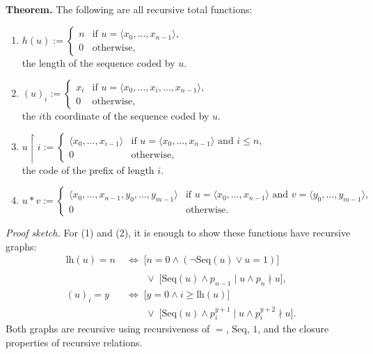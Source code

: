 \documentclass[11pt]{article}
\begin{document}
\textbf{Theorem.} The following are all recursive total functions:
\begin{enumerate}[leftmargin=1.8em, label=(\arabic*)]
    \item $h(u) := \begin{cases} n & \text{if } u = \langle x_0, \dots, x_{n-1}\rangle, \\ 0 & \text{otherwise,} \end{cases}$ \\
    the length of the sequence coded by $u$.

    \item $(u)_i := \begin{cases} x_i & \text{if } u = \langle x_0, \dots, x_i, \dots, x_{n-1}\rangle, \\ 0 & \text{otherwise,} \end{cases}$ \\
    the $i$th coordinate of the sequence coded by $u$.

    \item $u \upharpoonright i := \begin{cases} \langle x_0, \dots, x_{i-1}\rangle & \text{if } u = \langle x_0, \dots, x_{n-1}\rangle \text{ and } i \le n, \\ 0 & \text{otherwise,} \end{cases}$ \\
    the code of the prefix of length $i$.

    \item $u * v := \begin{cases} \langle x_0, \dots, x_{n-1}, y_0, \dots, y_{m-1}\rangle & \text{if } u = \langle x_0, \dots, x_{n-1}\rangle \text{ and } v = \langle y_0, \dots, y_{m-1}\rangle, \\ 0 & \text{otherwise.} \end{cases}$
\end{enumerate}

\textit{Proof sketch.} For (1) and (2), it is enough to show these functions have recursive graphs:
\begin{align*}
    \mathrm{lh}(u) = n \;&\iff\; \bigl[n = 0 \land (\neg \mathrm{Seq}(u) \lor u = 1)\bigr] \\
        &\qquad{}\\
        &\qquad {}\lor\; \bigl[\mathrm{Seq}(u) \land p_{n-1} \mid u \land p_n \nmid u\bigr], \\
    (u)_i = y \;&\iff\; \bigl[y = 0 \land i \ge \mathrm{lh}(u)\bigr] \\
        &\qquad {}\lor\; \bigl[\mathrm{Seq}(u) \land p_i^{y+1} \mid u \land p_i^{y+2} \nmid u\bigr].
\end{align*}
Both graphs are recursive using recursiveness of $=$, $\mathrm{Seq}$, $1$, and the closure properties of recursive relations.
\end{document}
